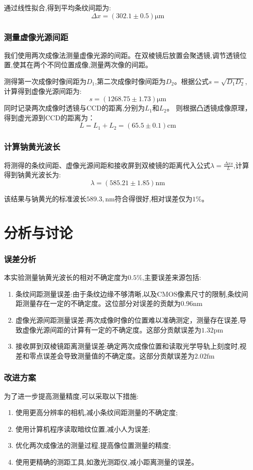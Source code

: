 \documentclass[UTF8]{ctexart}
\begin{document}
通过线性拟合,得到平均条纹间距为:
$$\Delta x=(302.1\pm0.5)\mathrm{\mu m}$$

\subsubsection{测量虚像光源间距}

我们使用两次成像法测量虚像光源的间距。在双棱镜后放置会聚透镜,调节透镜位置,使其在两个不同位置成像,测量两次像的间距。


测得第一次成像时像间距为$D_1$,第二次成像时像间距为$D_2$。根据公式$s=\sqrt{D_1D_2}$,计算得到虚像光源间距为:
$$s=(1268.75\pm 1.73)\mathrm{\mu m}$$
同时记录两次成像时透镜与CCD的距离,分别为$L_1$和$L_2$。
则根据凸透镜成像原理，得到虚光源到CCD的距离为：
$$L=L_1+L_2=(65.5\pm 0.1)\mathrm{cm}$$
\subsubsection{计算钠黄光波长}

将测得的条纹间距、虚像光源间距和接收屏到双棱镜的距离代入公式$\lambda=\frac{\Delta xs}{L}$,计算得到钠黄光波长为:
$$\lambda=(585.21\pm1.85)\mathrm{nm}$$

该结果与钠黄光的标准波长$589.3,\mathrm{nm}$符合得很好,相对误差仅为$1\%$。


\section{分析与讨论}

\subsubsection{误差分析}

本实验测量钠黄光波长的相对不确定度为$0.5\%$,主要误差来源包括:

\begin{enumerate}
    \item 条纹间距测量误差:由于条纹边缘不够清晰,以及CMOS像素尺寸的限制,条纹间距测量存在一定的不确定度。这位部分对误差的贡献为$0.96\mathrm{nm}$
    \item 虚像光源间距测量误差:两次成像时像的位置难以准确测定，测量存在误差,导致虚像光源间距的计算有一定的不确定度。这部分贡献误差为$1.32\mathrm{pm}$
    \item 接收屏到双棱镜距离测量误差:确定两次成像位置和读取光学导轨上刻度时,视差和零点误差会导致测量值的不确定度。这部分贡献误差为$2.02\mathrm{fm}$
\end{enumerate}
\subsubsection{改进方案}
为了进一步提高测量精度,可以采取以下措施:
\begin{enumerate}
\item 使用更高分辨率的相机,减小条纹间距测量的不确定度;
\item 使用计算机程序读取暗纹位置,减小人为误差;
\item 优化两次成像法的测量过程,提高像位置测量的精度;
\item 使用更精确的测距工具,如激光测距仪,减小距离测量的误差。
\end{enumerate}
\end{document}
